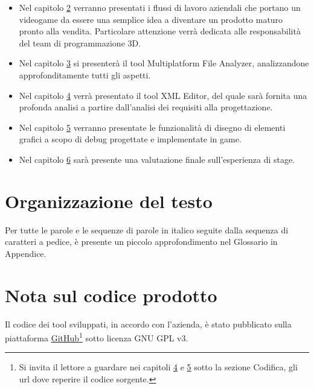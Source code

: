 \begin{itemize}
	\item Nel capitolo \hyperref[cap:milestone]{2} verranno presentati i flussi di lavoro aziendali che portano un videogame da essere una semplice idea a diventare un prodotto maturo pronto alla vendita. Particolare attenzione verrà dedicata alle responsabilità del team di programmazione 3D.
	
	
	\item Nel capitolo \hyperref[cap:multiplatform-file-analyzer]{3} si presenterà il tool Multiplatform File Analyzer, analizzandone approfonditamente tutti gli aspetti.
	
	\item Nel capitolo \hyperref[cap:xml-editor]{4} verrà presentato il tool XML Editor, del quale sarà fornita una profonda analisi a partire dall'analisi dei requisiti alla progettazione.
	
	\item Nel capitolo \hyperref[cap:game]{5} verranno presentate le funzionalità di disegno di elementi grafici a scopo di debug progettate e implementate in game.
	
	\item Nel capitolo \hyperref[cap:conclusioni]{6} sarà presente una valutazione finale sull'esperienza di stage.
\end{itemize}

\section{Organizzazione del testo}

Per tutte le parole e le sequenze di parole in italico seguite dalla sequenza di caratteri  a pedice, è presente un piccolo approfondimento nel Glossario in Appendice.

\section{Nota sul codice prodotto}

Il codice dei tool sviluppati, in accordo con l'azienda, è stato pubblicato sulla piattaforma \hyperref{https://github.com/}{}{}{GitHub\textsuperscript{\textregistered}}\footnote{Si invita il lettore a guardare nei capitoli \hyperref[cap:multiplatform-file-analyzer]{4} e \hyperref[cap:xml-editor]{5} sotto la sezione Codifica, gli url dove reperire il codice sorgente.} sotto licenza GNU GPL v3.\\

